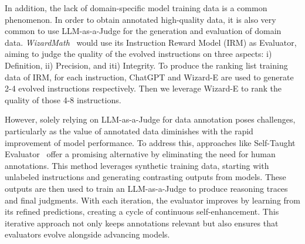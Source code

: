 In addition, the lack of domain-specific model training data is a common phenomenon. In order to obtain annotated high-quality data, it is also very common to use LLM-as-a-Judge for the generation and evaluation of domain data. \textit{WizardMath}~\cite{wizardmath} would use its Instruction Reward Model (IRM) as Evaluator, aiming to judge the quality of the evolved instructions on three aspects: i) Definition, ii) Precision, and iti) Integrity. To produce the ranking list training data of IRM, for each instruction, ChatGPT and Wizard-E are used to generate 2-4 evolved instructions respectively. Then we leverage Wizard-E to rank the quality of those 4-8 instructions.


However, solely relying on LLM-as-a-Judge for data annotation poses challenges, particularly as the value of annotated data diminishes with the rapid improvement of model performance. To address this, approaches like Self-Taught Evaluator~\citep{self_taught} offer a promising alternative by eliminating the need for human annotations. This method leverages synthetic training data, starting with unlabeled instructions and generating contrasting outputs from models. These outputs are then used to train an LLM-as-a-Judge to produce reasoning traces and final judgments. With each iteration, the evaluator improves by learning from its refined predictions, creating a cycle of continuous self-enhancement. This iterative approach not only keeps annotations relevant but also ensures that evaluators evolve alongside advancing models.










